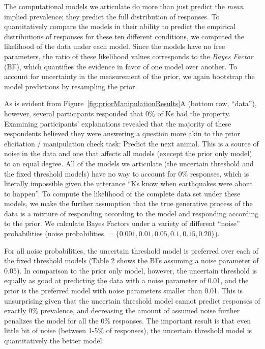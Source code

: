 \documentclass[floatsintext,man]{apa6}
\theoremstyle{definition}
\theoremstyle{definition}
\theoremstyle{definition}
\theoremstyle{remark}
\begin{document}
The computational models we articulate do more than just predict the
\emph{mean} implied prevalence; they predict the full distribution of
responses. To quantitatively compare the models in their ability to
predict the empirical distributions of responses for these ten different
conditions, we computed the likelihood of the data under each model.
Since the models have no free parameters, the ratio of these likelihood
values corresponds to the \emph{Bayes Factor} (BF), which quantifies the
evidence in favor of one model over another. To account for uncertainty
in the measurement of the prior, we again bootstrap the model
predictions by resampling the prior.

As is evident from Figure~\ref{fig:priorManipulationResults}A (bottom
row, \enquote{data}), however, several participants responded that 0\%
of Ks had the property. Examining participants' explanations revealed
that the majority of these respondents believed they were answering a
question more akin to the prior elicitation / manipulation check task:
Predict the next animal. This is a source of noise in the data and one
that affects all models (execept the prior only model) to an equal
degree. All of the models we articulate (the uncertain threshold and the
fixed threshold models) have no way to account for 0\% responses, which
is literally impossible given the utterance \enquote{Ks know when
earthquakes were about to happen}. To compute the likelihood of the
complete data set under these models, we make the further assumption
that the true generative process of the data is a mixture of responding
according to the model and responding according to the prior. We
calculate Bayes Factors under a variety of different \enquote{noise}
probabilities (noise probabilities
\(= \{0.001, 0.01, 0.05, 0.1, 0.15, 0.20\}\)).

For all noise probabilities, the uncertain threshold model is preferred
over each of the fixed threshold models (Table 2 shows the BFs assuming
a noise parameter of 0.05). In comparison to the prior only model,
however, the uncertain threshold is equally as good at predicting the
data with a noise parameter of 0.01, and the prior is the preferred
model with noise parameters smaller than 0.01. This is unsurprising
given that the uncertain threshold model cannot predict responses of
exactly 0\% prevalence, and decreasing the amount of assumed noise
further penalizes the model for all the 0\% responses. The important
result is that even little bit of noise (between 1-5\% of responses),
the uncertain threshold model is quantitatively the better model.
\end{document}
